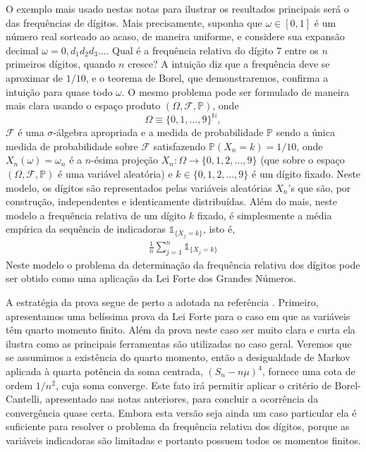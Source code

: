 \documentclass[12pt,portuguese]{article}
\theoremstyle{definition}
\theoremstyle{plainexercise}
\theoremstyle{starredexercise}
\theoremstyle{definition}
\begin{document}
O exemplo mais usado nestas notas para ilustrar os resultados principais
será o das frequências de dígitos. Mais precisamente, suponha que
$\omega\in [0,1]$ é um número real sorteado ao acaso, de maneira uniforme, e considere sua
expansão decimal $\omega=0{,}d_1d_2d_3\ldots$. Qual é a frequência relativa
do dígito $7$ entre os $n$ primeiros dígitos, quando $n$ cresce? A intuição diz
que a frequência deve se aproximar de $1/10$, e o teorema de Borel, que
demonstraremos, confirma a intuição para quase todo $\omega$. O mesmo problema
pode ser formulado de maneira mais clara usando o espaço produto $(\Omega,\mathcal{F},\mathbb{P})$, onde
\[
\Omega\equiv \{0,1,\ldots,9\}^{\mathbb{N}},
\]
$\mathcal{F}$ é uma $\sigma$-álgebra apropriada e a medida de probabilidade $\mathbb{P}$
sendo a única medida de probabilidade sobre $\mathcal{F}$ 
satisfazendo $\mathbb{P}(X_n=k)=1/10$, onde
$X_n(\omega)=\omega_n$ é a $n$-ésima projeção $X_n:\Omega\to \{0,1,2,\ldots,9\}$ 
(que sobre o espaço $(\Omega,\mathcal{F},\mathbb{P})$ é uma variável aleatória)
e $k\in \{0,1,2,\ldots,9\}$ é um dígito fixado. 
Neste modelo, os dígitos são representados pelas variáveis aleatórias $X_n$'s 
que são, por construção, independentes e identicamente distribuídas. 
Além do mais, neste modelo a frequência relativa de um dígito $k$ fixado, 
é simplesmente a média empírica da sequência de indicadoras $\mathds{1}_{\{X_j=k\}}$,
isto é, 
\begin{align*}
\frac{1}{n} \sum_{j=1}^n \mathds{1}_{\{X_j=k\}}
\end{align*}
Neste modelo o problema da determinação da frequência relativa dos dígitos
pode ser obtido como uma aplicação da Lei Forte dos Grandes Números. 


A estratégia da prova segue de perto a adotada na referência \cite{MR3930614}. 
Primeiro, apresentamos uma belíssima prova da Lei Forte para o caso em que as
variáveis têm quarto momento finito. Além da prova neste caso ser muito clara
e curta ela ilustra como as principais ferramentas são utilizadas no caso geral. 
Veremos que se assumimos a existência do quarto momento,
então a desigualdade de Markov aplicada à quarta potência da soma centrada, 
$(S_n-n\mu)^4$, fornece uma cota de ordem $1/n^2$, cuja soma converge. 
Este fato irá permitir aplicar o critério de Borel-Cantelli, 
apresentado nas notas anteriores, para concluir a ocorrência da convergência quase
certa.
Embora esta versão seja ainda um caso particular ela é suficiente 
para resolver o problema da frequência relativa dos dígitos, porque as variáveis
indicadoras são limitadas e portanto possuem todos os momentos finitos. 
\end{document}
